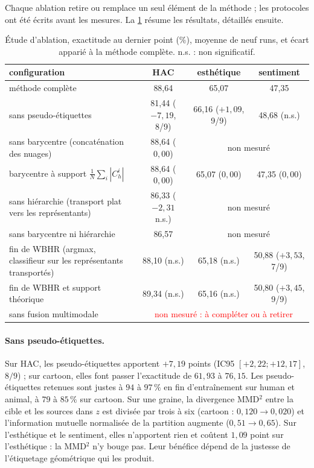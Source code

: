 \documentclass[11pt,a4paper]{article}
\theoremstyle{definition}
\theoremstyle{remark}
\newcommand{\abs}[1]{\left\lvert #1 \right\rvert}
\begin{document}
Chaque ablation retire ou remplace un seul élément de la méthode ; les protocoles ont été écrits avant les mesures.
La \cref{tab-ablation} résume les résultats, détaillés ensuite.

\begin{table}[ht]
\centering
\caption{Étude d'ablation, exactitude au dernier point ($\%$), moyenne de neuf runs, et écart apparié à la méthode
  complète. n.s. : non significatif.}\label{tab-ablation}
\small
\begin{tabularx}{\linewidth}{>{\raggedright\arraybackslash}X ccc}
\toprule
configuration & HAC & esthétique & sentiment \\
\midrule
méthode complète & 88,64 & 65,07 & 47,35 \\
\midrule
sans pseudo-étiquettes & 81,44 ($-7{,}19$, 8/9) & 66,16 ($+1{,}09$, 9/9) & 48,68 (n.s.) \\
sans barycentre (concaténation des nuages) & 88,64 ($0{,}00$) & \multicolumn{2}{c}{non mesuré} \\
barycentre à support $\frac1N \sum_i \abs{C^i_h}$ & 88,64 ($0{,}00$) & 65,07 ($0{,}00$) & 47,35 ($0{,}00$) \\
sans hiérarchie (transport plat vers les représentants) & 86,33 ($-2{,}31$ n.s.) & \multicolumn{2}{c}{non mesuré} \\
sans barycentre ni hiérarchie & 86,57 & \multicolumn{2}{c}{non mesuré} \\
fin de WBHR (argmax, classifieur sur les représentants transportés) & 88,10 (n.s.) & 65,18 (n.s.) & 50,88 ($+3{,}53$, 7/9) \\
fin de WBHR et support théorique & 89,34 (n.s.) & 65,16 (n.s.) & 50,80 ($+3{,}45$, 9/9) \\
sans fusion multimodale & \multicolumn{3}{c}{\textcolor{red}{non mesuré : à compléter ou à retirer}} \\
\bottomrule
\end{tabularx}
\end{table}

\paragraph{Sans pseudo-étiquettes.}
Sur HAC, les pseudo-étiquettes apportent $+7{,}19$ points (IC95 $[+2{,}22 ; +12{,}17]$, $8/9$) ; sur cartoon, elles
font passer l'exactitude de $61{,}93$ à $76{,}15$. Les pseudo-étiquettes retenues sont justes à $94$ à $97\,\%$ en fin
d'entraînement sur human et animal, à $79$ à $85\,\%$ sur cartoon. Sur une graine, la divergence MMD$^2$ entre la cible
et les sources dans $z$ est divisée par trois à six (cartoon : $0{,}120 \to 0{,}020$) et l'information mutuelle
normalisée de la partition augmente ($0{,}51 \to 0{,}65$). Sur l'esthétique et le sentiment, elles n'apportent rien et
coûtent $1{,}09$ point sur l'esthétique : la MMD$^2$ n'y bouge pas. Leur bénéfice dépend de la justesse de l'étiquetage
géométrique qui les produit.
\end{document}

